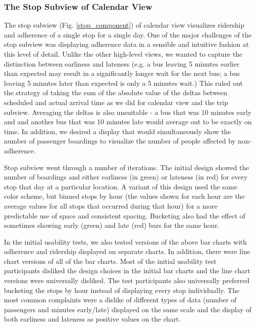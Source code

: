\documentclass[journal]{vgtc}
\begin{document}
\subsubsection{The Stop Subview of Calendar View}
The stop subview (Fig. \ref{stop_component}) of calendar view visualizes ridership and adherence of a single stop for a single day. One of the major challenges of the stop subview was displaying adherence data in a sensible and intuitive fashion at this level of detail. Unlike the other high-level views, we wanted to capture the distinction between earliness and lateness (e.g. a bus leaving 5 minutes earlier than expected may result in a significantly longer wait for the next bus; a bus leaving 5 minutes later than expected is only a 5 minutes wait.) This ruled out the strategy of taking the sum of the absolute value of the deltas between scheduled and actual arrival time as we did for calendar view and the trip subview. Averaging the deltas is also unsuitable - a bus that was 10 minutes early and and another bus that was 10 minutes late would average out to be exactly on time. In addition, we desired a display that would simultaneously show the number of passenger boardings to visualize the number of people affected by non-adherence.

Stop subview went through a number of iterations. The initial design showed the number of boardings and either earliness (in green) or lateness (in red) for every stop that day at a particular location. A variant of this design used the same color scheme, but binned stops by hour (the values shown for each hour are the average values for all stops that occurred during that hour) for a more predictable use of space and consistent spacing. Bucketing also had the effect of sometimes showing early (green) and late (red) bars for the same hour.

In the initial usability tests, we also tested versions of the above bar charts with adherence and ridership displayed on separate charts. In addition, there were line chart versions of all of the bar charts. Most of the initial usability test participants disliked the design choices in the initial bar charts and the line chart versions were universally disliked. The test participants also universally preferred bucketing the stops by hour instead of displaying every stop individually. The most common complaints were a dislike of different types of data (number of passengers and minutes early/late) displayed on the same scale and the display of both earliness and lateness as positive values on the chart.
\end{document}
